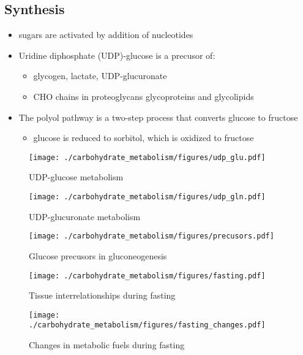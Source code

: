 \documentclass{scrartcl}
\begin{document}
\subsection{Synthesis}
\label{sec:org60c50a8}
\begin{itemize}
\item sugars are activated by addition of nucleotides
\item Uridine diphosphate (UDP)-glucose is a precusor of:
\begin{itemize}
\item glycogen, lactate, UDP-glucuronate
\item CHO chains in proteoglycans glycoproteins and glycolipids
\end{itemize}
\item The polyol pathway is a two-step process that converts glucose to
fructose
\begin{itemize}
\item glucose is reduced to sorbitol, which is oxidized to fructose
\end{itemize}
\end{itemize}

\begin{figure}[htbp]
\centering
\texttt{[image: ./carbohydrate\_metabolism/figures/udp\_glu.pdf]}
\caption{\label{fig:orged79772}
UDP-glucose metabolism}
\end{figure}

\begin{figure}[htbp]
\centering
\texttt{[image: ./carbohydrate\_metabolism/figures/udp\_gln.pdf]}
\caption{\label{fig:org629db97}
UDP-glucuronate metabolism}
\end{figure}

\begin{figure}[htbp]
\centering
\texttt{[image: ./carbohydrate\_metabolism/figures/precusors.pdf]}
\caption{\label{fig:org92f06d2}
Glucose precusors in gluconeogenesis}
\end{figure}


\begin{figure}[htbp]
\centering
\texttt{[image: ./carbohydrate\_metabolism/figures/fasting.pdf]}
\caption{\label{fig:org5d4ac2a}
Tissue interrelationships during fasting}
\end{figure}


\begin{figure}[htbp]
\centering
\texttt{[image: ./carbohydrate\_metabolism/figures/fasting\_changes.pdf]}
\caption{\label{fig:orgaa7179e}
Changes in metabolic fuels during fasting}
\end{figure}
\end{document}

